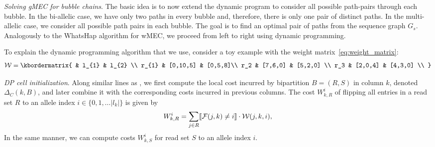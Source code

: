 \textit{Solving gMEC for bubble chains}. The basic idea is to now extend the dynamic program to consider all possible path-pairs through each bubble. 
In the bi-allelic case, we have only two paths in every bubble and, therefore, there is only one pair of distinct paths.
In the multi-allelic case, we consider all possible path pairs in each bubble.
The goal is to find an optimal pair of paths from the sequence graph $G_s$.
Analogously to the WhatsHap algorithm for wMEC, we proceed from left to right using dynamic programming.  

To explain the dynamic programming algorithm that we use, consider a toy example with the weight matrix~\eqref{eq:weight_matrix}:
\begin{equation}\label{eq:weight_matrix1}
  \mathcal{W}  = \kbordermatrix{
     & l_{1}       & l_{2}  \\
    r_{1}       & [0,10,5] &  [0,5,8]\\
    r_2 & [7,6,0] & [5,2,0] \\
    r_3 & [2,0,4] & [4,3,0] \\
  }
\end{equation}

\textit{DP cell initialization}. Along similar lines as \cite{Patterson2015}, we first compute the local cost incurred by bipartition $B= (R,S)$ in column $k$, denoted $\Delta_C(k,B)$, and later combine it with the corresponding costs incurred in previous columns.
The cost $W_{k,R}^i$ of flipping all entries in a read set $R$ to an allele index $i\in\{0,1,\ldots |l_k|\}$ is given by 
\[W_{k,R}^i = \sum_{j\in R}\llbracket \mathcal{F}(j,k)\neq i\rrbracket\cdot\mathcal{W}(j,k,i),\]
In the same manner, we can compute costs $W_{k,S}^i$ for read set $S$ to an allele index $i$.


